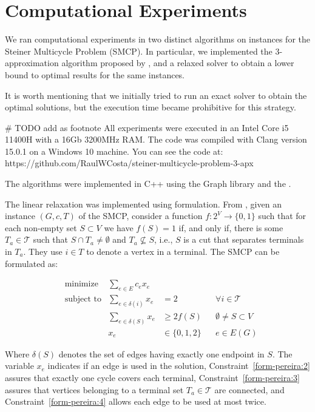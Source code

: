 \chapter{Computational Experiments}
\label{chapter:experiments}

We ran computational experiments in two distinct algorithms on instances for the Steiner Multicycle Problem (SMCP). In particular, we implemented the \(3\)-approximation algorithm proposed by \cite{smcp_3apx}, and a relaxed solver to obtain a lower bound to optimal results for the same instances.

It is worth mentioning that we initially tried to run an exact solver to obtain the optimal solutions, but the execution time became prohibitive for this strategy.

# TODO add as footnote
All experiments were executed in an Intel Core i5 11400H with a 16Gb 3200MHz RAM. The code was compiled with Clang version 15.0.1 on a Windows 10 machine. You can see the code at: https://github.com/RaulWCosta/steiner-multicycle-problem-3-apx

The algorithms were implemented in C++ using the Graph library \cite{lemon} and the \cite{gurobi}.

The linear relaxation was implemented using \cite{Pereira2018TheSM} formulation. From \citeauthor{Pereira2018TheSM}, given an instance \((G, c, T)\) of the SMCP, consider a function \(f: 2^V \rightarrow \{0, 1\}\) such that for each non-empty set \(S \subset V\) we have \(f(S) = 1\) if, and only if, there is some \(T_a \in \mathcal{T}\) such that \(S \cap T_a \neq \emptyset\) and \(T_a \nsubseteq S\), i.e., \(S\) is a cut that separates terminals in \(T_a\). They use \(i \in T\) to denote a vertex in a terminal. The SMCP can be formulated as:

\begin{align}
&\text{minimize} &\sum_{e\in E} c_e x_e \label{form-pereira:1}\\
&\text{subject to} &\sum_{e \in \delta(i)} x_e &= 2 &&\text{\(\forall i \in \mathcal{T}\)} \label{form-pereira:2}\\ 
&&\sum_{e \in \delta(S)} x_e &\geq 2 f(S) &&\text{\(\emptyset \neq S \subset V\)} \label{form-pereira:3}\\ 
&&x_e &\in \{0, 1, 2\} &&\text{$e \in E(G)$} \label{form-pereira:4}
\end{align}

Where \(\delta(S)\) denotes the set of edges having exactly one endpoint in \(S\). The variable \(x_e\) indicates if an edge is used in the solution, Constraint~\eqref{form-pereira:2} assures that exactly one cycle covers each terminal, Constraint~\eqref{form-pereira:3} assures that vertices belonging to a terminal set \(T_a \in \mathcal{T}\) are connected, and Constraint~\eqref{form-pereira:4} allows each edge to be used at most twice.

